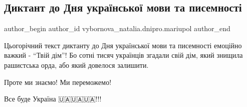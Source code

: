  
 
 
 
 

\subsection{Диктант до Дня української мови та писемності}
\label{sec:09_11_2022.fb.vybornova_natalia.dnipro.mariupol.1.diktant_do_dnya_ukra}

\ifcmt
 author_begin
   author_id vybornova_natalia.dnipro.mariupol
 author_end
\fi

Цьогорічний текст диктанту до Дня української мови та писемності емоційно
важкий - \enquote{Твій дім}! Бо сотні тисяч українців згадали свій дім, який знищила
рашистська орда, або який довелося залишити. 

Проте ми знаємо! Ми переможемо! 

Все буде Україна 🇺🇦🇺🇦🇺🇦!!!
